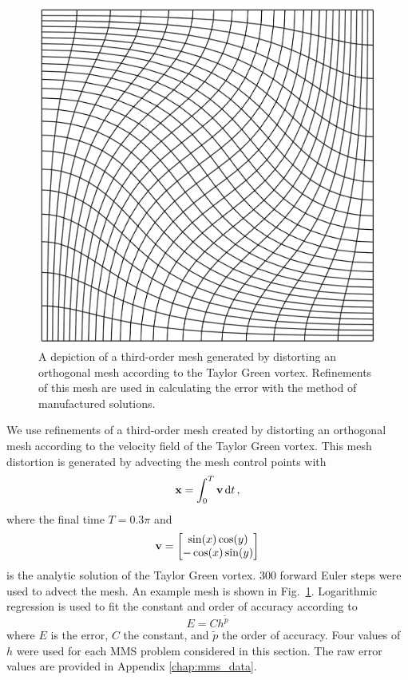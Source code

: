 \documentclass[../doc.tex]{subfiles}
\begin{document}
\begin{figure}
\centering
\includegraphics[width=.35\textwidth]{data/img/tgmesh0.3.png}
\caption{A depiction of a third-order mesh generated by distorting an orthogonal mesh according to the Taylor Green vortex. Refinements of this mesh are used in calculating the error with the method of manufactured solutions.}
\label{rtvef:tgmesh}
\end{figure}
We use refinements of a third-order mesh created by distorting an orthogonal mesh according to the velocity field of the Taylor Green vortex. This mesh distortion is generated by advecting the mesh control points with 
	\begin{equation}
		\boldsymbol{\mathrm{x}} = \int_0^T \boldsymbol{\mathrm{v}} \mathop{}\!\mathrm{d} t \,,
	\end{equation}
where the final time $T=0.3\pi$ and 
	\begin{equation}
		\boldsymbol{\mathrm{v}} = \begin{bmatrix} 
			\sin(x) \cos(y) \\ 
			-\cos(x) \sin(y) 
		\end{bmatrix}
	\end{equation}
is the analytic solution of the Taylor Green vortex. 300 forward Euler steps were used to advect the mesh. An example mesh is shown in Fig.~\ref{rtvef:tgmesh}. Logarithmic regression is used to fit the constant and order of accuracy according to 
	\begin{equation}
		E = C h^{\tilde{p}}
	\end{equation}
where $E$ is the error, $C$ the constant, and $\tilde{p}$ the order of accuracy. Four values of $h$ were used for each MMS problem considered in this section. 
The raw error values are provided in Appendix \ref{chap:mms_data}. 
\end{document}
